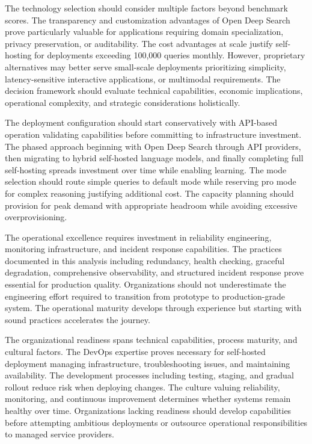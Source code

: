 The technology selection should consider multiple factors beyond benchmark scores. The transparency and customization advantages of Open Deep Search prove particularly valuable for applications requiring domain specialization, privacy preservation, or auditability. The cost advantages at scale justify self-hosting for deployments exceeding 100,000 queries monthly. However, proprietary alternatives may better serve small-scale deployments prioritizing simplicity, latency-sensitive interactive applications, or multimodal requirements. The decision framework should evaluate technical capabilities, economic implications, operational complexity, and strategic considerations holistically.

The deployment configuration should start conservatively with API-based operation validating capabilities before committing to infrastructure investment. The phased approach beginning with Open Deep Search through API providers, then migrating to hybrid self-hosted language models, and finally completing full self-hosting spreads investment over time while enabling learning. The mode selection should route simple queries to default mode while reserving pro mode for complex reasoning justifying additional cost. The capacity planning should provision for peak demand with appropriate headroom while avoiding excessive overprovisioning.

The operational excellence requires investment in reliability engineering, monitoring infrastructure, and incident response capabilities. The practices documented in this analysis including redundancy, health checking, graceful degradation, comprehensive observability, and structured incident response prove essential for production quality. Organizations should not underestimate the engineering effort required to transition from prototype to production-grade system. The operational maturity develops through experience but starting with sound practices accelerates the journey.

The organizational readiness spans technical capabilities, process maturity, and cultural factors. The DevOps expertise proves necessary for self-hosted deployment managing infrastructure, troubleshooting issues, and maintaining availability. The development processes including testing, staging, and gradual rollout reduce risk when deploying changes. The culture valuing reliability, monitoring, and continuous improvement determines whether systems remain healthy over time. Organizations lacking readiness should develop capabilities before attempting ambitious deployments or outsource operational responsibilities to managed service providers.

